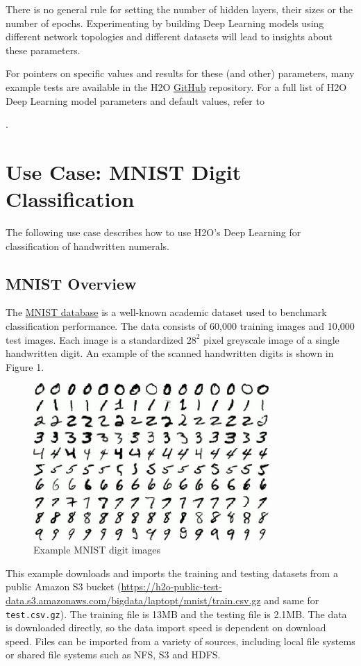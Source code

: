 {There is no general rule for setting the number of hidden layers, their sizes or the number of epochs. Experimenting by building Deep Learning models using different network topologies and different datasets will lead to insights about these parameters.

For pointers on specific values and results for these (and other) parameters, many example tests are available in the H2O \href{https://github.com/h2oai/h2o-3/}{GitHub} repository. For a full list of H2O Deep Learning model parameters and default values, refer to {\textbf{}. 


\section{Use Case: MNIST Digit Classification} 
The following use case describes how to use H2O's Deep Learning for classification of handwritten numerals. 

\subsection{MNIST Overview} 

The \href{http://yann.lecun.com/exdb/mnist/}{MNIST database} is a well-known academic dataset used to benchmark classification performance.  The data consists of 60,000 training images and 10,000 test images. Each image is a standardized $28^2$ pixel greyscale image of a single handwritten digit.  An example of the scanned handwritten digits is shown in Figure 1. 

\begin{figure}[ht!]
\centering
\includegraphics[width=90mm]{./images/mnistdigits.jpg}
\caption{Example MNIST digit images \label{overflow}}
\end{figure}

This example downloads and imports the training and testing datasets from a public Amazon S3 bucket (\url{https://h2o-public-test-data.s3.amazonaws.com/bigdata/laptopt/mnist/train.csv.gz} and same for \texttt{test.csv.gz}).
The training file is 13MB and the testing file is 2.1MB. The data is downloaded directly, so the data import speed is dependent on download speed.  Files can be imported from a variety of sources, including local file systems or shared file systems such as NFS, S3 and HDFS.

}}
